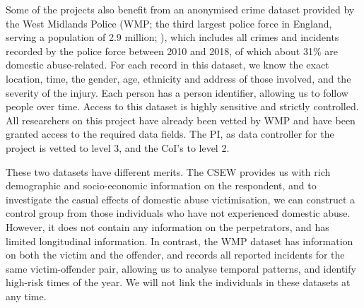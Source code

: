 \documentclass[11pt, a4paper]{article}
\begin{document}


Some of the projects also benefit from an anonymised crime dataset provided by the West Midlands Police (WMP; the third largest police force in England, serving a population of 2.9 million; ), which includes all crimes and incidents recorded by the police force between 2010 and 2018, of which about 31\% are domestic abuse-related. For each record in this dataset, we know the exact location, time, the gender, age, ethnicity and address of those involved, and the severity of the injury. Each person has a person identifier, allowing us to follow people over time. Access to this dataset is highly sensitive and strictly controlled. All researchers on this project have already been vetted by WMP and have been granted access to the required data fields. The PI, as data controller for the project is vetted to level 3, and the CoI's to level 2.

These two datasets have different merits. The CSEW provides us with rich demographic and socio-economic information on the respondent, and to investigate the casual effects of domestic abuse victimisation, we can construct a control group from those individuals who have not experienced domestic abuse. However, it does not contain any information on the perpetrators, and has limited longitudinal information. In contrast, the WMP dataset has information on both the victim and the offender, and records all reported incidents for the same victim-offender pair, allowing us to analyse temporal patterns, and identify high-risk times of the year. We will not link the individuals in these datasets at any time.
\end{document}
